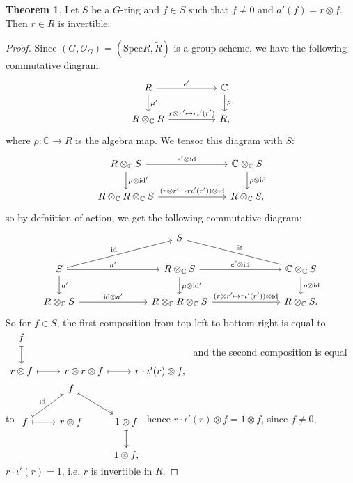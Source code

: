\documentclass{article}
\theoremstyle{definition}
\newtheorem{theorem}{Theorem}
\newcommand{\Spec}{\mathrm{Spec}}
\newcommand{\ssheaf}[1]{\widetilde{#1}}
\newcommand{\tensorC}[2]{#1\otimes_\mathbb C #2}
\newcommand{\tensor}[2]{#1\otimes#2}
\newcommand{\so}[1]{(#1, \mathcal O_{#1})}
\newcommand{\id}{\mathrm{id}}
\newcommand{\sr}[1]{(\Spec{#1},\ssheaf{#1})}
\begin{document}
\begin{theorem}
Let $S$ be a $G$-ring and $f\in S$ such that $f\ne 0$ and $a'(f)=\tensor r f$. Then $r\in R$ is invertible.
\end{theorem}
\begin{proof}
  Since $\so G=\sr R$ is a group scheme, we have the following commutative diagram:
  \begin{equation*}
    \begin{tikzcd}[column sep=huge]
      R \arrow[r, "e'"]\arrow[d, "\mu'"]& \mathbb C\arrow[d, "\rho"] \\
      {\tensorC R R} \arrow[r, "\tensor r{r'}\mapsto r\iota'(r')"] & R,
    \end{tikzcd}
  \end{equation*}
  where $\rho : \mathbb C\to R$ is the algebra map. We tensor this diagram with $S$:
    \begin{equation*}
    \begin{tikzcd}[column sep=7em]
      \tensorC R S \arrow[r, "{\tensor{e'}\id}"]\arrow[d, "\tensor\mu\id'"]& \tensorC{\mathbb C}S\arrow[d, "{\tensor\rho\id}"] \\
      {\tensorC{\tensorC R R}S} \arrow[r, "\tensor{(\tensor r{r'}\mapsto r\iota'(r'))}\id"] & \tensorC R S,
    \end{tikzcd}
  \end{equation*}
  so by defniition of action, we get the following commutative diagram:
  \begin{equation*}
    \begin{tikzcd}[column sep=7em]
        &  S \arrow[rd, no head, "\cong"] \\
      S\arrow[ru, "\id"] \arrow[r, "a'"]\arrow[d, "a'"] & \tensorC R S \arrow[r, "{\tensor{e'}\id}"]\arrow[d, "\tensor\mu\id'"]& \tensorC{\mathbb C}S\arrow[d, "{\tensor\rho\id}"] \\
      {\tensorC R S} \arrow[r, "\tensor\id{a'}"]& {\tensorC{\tensorC R R}S} \arrow[r, "\tensor{(\tensor r{r'}\mapsto r\iota'(r'))}\id"] & \tensorC R S.
    \end{tikzcd}
  \end{equation*}
  So for $f\in S$, the first composition from top left to bottom right is equal to
$
    \begin{tikzcd}
      f \arrow[d, mapsto]\\
      \tensor r f\arrow[r, mapsto] & \tensor{\tensor r r} f\arrow[r, mapsto] & \tensor{r\cdot\iota'(r)}f,
    \end{tikzcd}
  $
  and the second composition is equal to
$
    \begin{tikzcd}
      & f \arrow[rd, mapsto]& \\
      f \arrow[ru, mapsto, "\id"] \arrow[r, mapsto]& \tensor r f & \tensor1f \arrow[d, mapsto]\\
      & & \tensor1f,
    \end{tikzcd}
 $
  hence $\tensor{r\cdot\iota'(r)}f=\tensor1f$, since $f\ne0$, $r\cdot\iota'(r)=1$, i.e. $r$ is invertible in $R$.
\end{proof}
\end{document}

